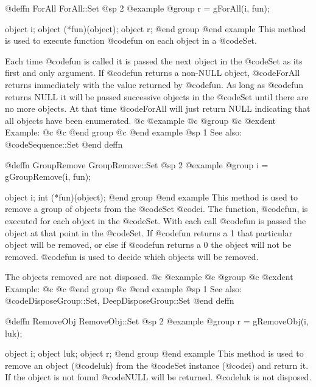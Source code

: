 @deffn {ForAll} ForAll::Set
@sp 2
@example
@group
r = gForAll(i, fun);

object  i;
object  (*fun)(object);
object  r;
@end group
@end example
This method is used to execute function @code{fun} on each object in a @code{Set}.

Each time @code{fun} is called it is passed the next object in the @code{Set}
as its first and only argument.  If @code{fun} returns a non-NULL
object, @code{ForAll} returns immediately with the value returned by
@code{fun}.  As long as @code{fun} returns NULL it will be passed
successive objects in the @code{Set} until there are no more objects.  At
that time @code{ForAll} will just return NULL indicating that all
objects have been enumerated.
@c @example
@c @group
@c @exdent Example:
@c 
@c @end group
@c @end example
@sp 1
See also:  @code{Sequence::Set}
@end deffn



















@deffn {GroupRemove} GroupRemove::Set
@sp 2
@example
@group
i = gGroupRemove(i, fun);

object  i;
int     (*fun)(object);
@end group
@end example
This method is used to remove a group of objects from the @code{Set}
@code{i}.  The function, @code{fun}, is executed for each
object in the @code{Set}.  With each call @code{fun} is passed the
object at that point in the @code{Set}.  If @code{fun} returns a 1
that particular object will be removed, or else if @code{fun}
returns a 0 the object will not be removed.  @code{fun} is used
to decide which objects will be removed.

The objects removed are not disposed.
@c @example
@c @group
@c @exdent Example:
@c 
@c @end group
@c @end example
@sp 1
See also:  @code{DisposeGroup::Set, DeepDisposeGroup::Set}
@end deffn













@deffn {RemoveObj} RemoveObj::Set
@sp 2
@example
@group
r = gRemoveObj(i, luk);

object  i;
object  luk;
object  r;
@end group
@end example
This method is used to remove an object (@code{luk}) from the @code{Set}
instance (@code{i}) and return it.  If the object is not found
@code{NULL} will be returned.  @code{luk} is not disposed.

